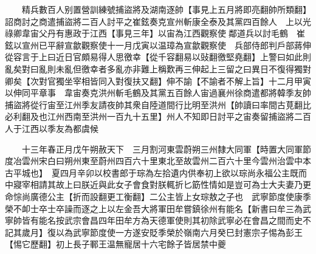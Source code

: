 　　精兵數百人别置營訓練號捕盜將及湖南逐帥【事見上五月將即亮翻帥所類翻】詔商討之商遣捕盜將二百人討平之崔鉉奏克宣州斬康全泰及其黨四百餘人　上以光祿卿韋宙父丹有惠政于江西【事見三年】以宙為江西觀察使鄰道兵以討毛鶴　崔鉉以宣州已平辭宣歙觀察使十一月戊寅以温璋為宣歙觀察使　兵部侍郎判戶部蔣伸從容言于上曰近日官頗易得人思徼幸【從千容翻易以䜴翻徼堅堯翻】上警曰如此則亂矣對曰亂則未亂但徼幸者多亂亦非難上稱歎再三伸起上三留之曰異日不復得獨對卿矣【次對官獨坐宰相皆同入對復扶又翻】伸不諭【不諭者不解上旨】十二月甲寅以伸同平章事　韋宙奏克洪州斬毛鶴及其黨五百餘人宙過襄州徐商遣都將韓季友帥捕盜將從行宙至江州季友請夜帥其衆自陸道間行比明至洪州【帥讀曰率間古莧翻比必利翻及也江州西南至洪州一百九十五里】州人不知即日討平之宙奏留捕盜將二百人于江西以季友為都虞候

　　十三年春正月戊午朔赦天下　三月割河東雲蔚朔三州隸大同軍【時置大同軍節度冶雲州宋白曰朔州東至蔚州四百六十里東北至故雲州二百六十里今雲州治雲中本古平城也】　夏四月辛卯以校書郎于琮為左拾遺内供奉初上欲以琮尚永福公主既而中寢宰相請其故上曰朕近與此女子會食對朕輒折匕筯性情如是豈可為士大夫妻乃更命悰尚廣德公主【折而設翻更工衡翻】二公主皆上女琮敖之子也　武寧節度使康季榮不卹士卒士卒譟而逐之上以左金吾大將軍田牟嘗鎮徐州有能名【新書曰牟三為武寧帥皆有能名按武宗會昌四年田牟方為天德軍使則其初除武寧必在會昌之間而史不記其歲月】復以為武寧節度使一方遂安貶季榮於嶺南六月癸巳封憲宗子惕為彭王【惕它歷翻】初上長子鄆王温無寵居十六宅餘子皆居禁中夔

